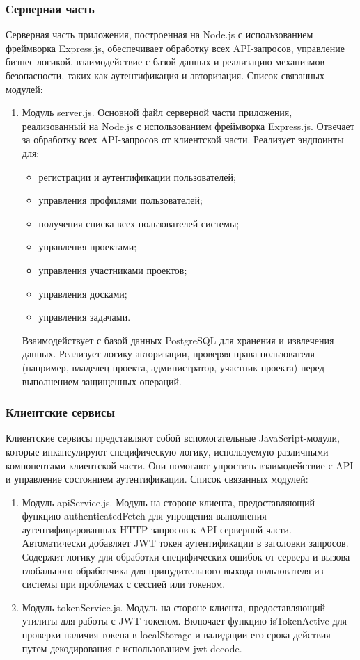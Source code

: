 \subsubsection{Серверная часть}
Серверная часть приложения, построенная на Node.js с использованием фреймворка Express.js, обеспечивает обработку всех API-запросов, управление бизнес-логикой, взаимодействие с базой данных и реализацию механизмов безопасности, таких как аутентификация и авторизация. Список связанных модулей:
\begin{enumerate}
	\item Модуль server.js. Основной файл серверной части приложения, реализованный на Node.js с использованием фреймворка Express.js. Отвечает за обработку всех API-запросов от клиентской части. Реализует эндпоинты для:
	\begin{itemize}
		\item регистрации и аутентификации пользователей;
		\item управления профилями пользователей;
		\item получения списка всех пользователей системы;
		\item управления проектами;
		\item управления участниками проектов;
		\item управления досками;
		\item управления задачами.
	\end{itemize}

Взаимодействует с базой данных PostgreSQL для хранения и извлечения данных. Реализует логику авторизации, проверяя права пользователя (например, владелец проекта, администратор, участник проекта) перед выполнением защищенных операций.
\end{enumerate}

\subsubsection{Клиентские сервисы}
Клиентские сервисы представляют собой вспомогательные JavaScript-модули, которые инкапсулируют специфическую логику, используемую различными компонентами клиентской части. Они помогают упростить взаимодействие с API и управление состоянием аутентификации. Список связанных модулей:
\begin{enumerate}
	\item Модуль apiService.js. Модуль на стороне клиента, предоставляющий функцию authenticatedFetch для упрощения выполнения аутентифицированных HTTP-запросов к API серверной части. Автоматически добавляет JWT токен аутентификации в заголовки запросов. Содержит логику для обработки специфических ошибок от сервера и вызова глобального обработчика для принудительного выхода пользователя из системы при проблемах с сессией или токеном.
	\item Модуль tokenService.js. Модуль на стороне клиента, предоставляющий утилиты для работы с JWT токеном. Включает функцию isTokenActive для проверки наличия токена в localStorage и валидации его срока действия путем декодирования с использованием jwt-decode.
\end{enumerate}


